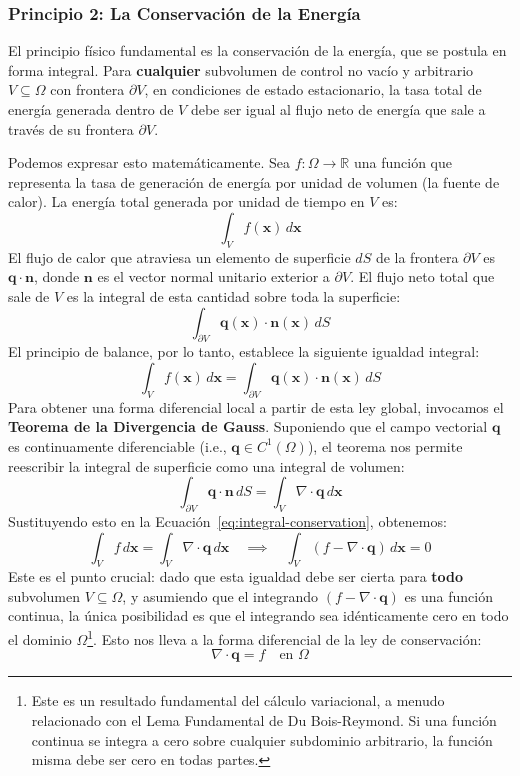 \subsubsection{Principio 2: La Conservación de la Energía}
El principio físico fundamental es la conservación de la energía, que se postula en forma integral. Para \textbf{cualquier} subvolumen de control no vacío y arbitrario \(V \subseteq \Omega\) con frontera \(\partial V\), en condiciones de estado estacionario, la tasa total de energía generada dentro de \(V\) debe ser igual al flujo neto de energía que sale a través de su frontera \(\partial V\).

Podemos expresar esto matemáticamente. Sea \(f: \Omega \to \mathbb{R}\) una función que representa la tasa de generación de energía por unidad de volumen (la fuente de calor). La energía total generada por unidad de tiempo en \(V\) es:
\[
\int_V f(\bm{x}) \, d\bm{x}
\]
El flujo de calor que atraviesa un elemento de superficie \(dS\) de la frontera \(\partial V\) es \(\bm{q} \cdot \bm{n}\), donde \(\bm{n}\) es el vector normal unitario exterior a \(\partial V\). El flujo neto total que sale de \(V\) es la integral de esta cantidad sobre toda la superficie:
\[
\int_{\partial V} \bm{q}(\bm{x}) \cdot \bm{n}(\bm{x}) \, dS
\]
El principio de balance, por lo tanto, establece la siguiente igualdad integral:
\begin{equation}
    \int_V f(\bm{x}) \, d\bm{x} = \int_{\partial V} \bm{q}(\bm{x}) \cdot \bm{n}(\bm{x}) \, dS
    \label{eq:integral-conservation}
\end{equation}
Para obtener una forma diferencial local a partir de esta ley global, invocamos el \textbf{Teorema de la Divergencia de Gauss}. Suponiendo que el campo vectorial \(\bm{q}\) es continuamente diferenciable (i.e., \(\bm{q} \in C^1(\Omega)\)), el teorema nos permite reescribir la integral de superficie como una integral de volumen:
\[
\int_{\partial V} \bm{q} \cdot \bm{n} \, dS = \int_V \nabla \cdot \bm{q} \, d\bm{x}
\]
Sustituyendo esto en la Ecuación~\eqref{eq:integral-conservation}, obtenemos:
\[
\int_V f \, d\bm{x} = \int_V \nabla \cdot \bm{q} \, d\bm{x} \quad \implies \quad \int_V (f - \nabla \cdot \bm{q}) \, d\bm{x} = 0
\]
Este es el punto crucial: dado que esta igualdad debe ser cierta para \textbf{todo} subvolumen \(V \subseteq \Omega\), y asumiendo que el integrando \((f - \nabla \cdot \bm{q})\) es una función continua, la única posibilidad es que el integrando sea idénticamente cero en todo el dominio \(\Omega\)\footnote{Este es un resultado fundamental del cálculo variacional, a menudo relacionado con el Lema Fundamental de Du Bois-Reymond. Si una función continua se integra a cero sobre cualquier subdominio arbitrario, la función misma debe ser cero en todas partes.}. Esto nos lleva a la forma diferencial de la ley de conservación:
\begin{equation}
    \nabla \cdot \bm{q} = f \quad \text{en } \Omega
    \label{eq:conservation-law}
\end{equation}

